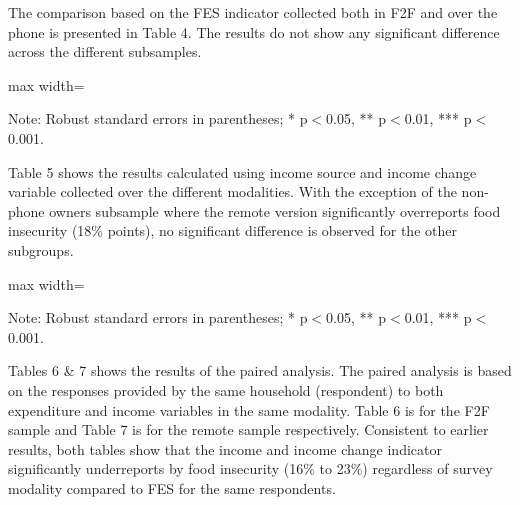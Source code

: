 \documentclass[11pt,harvard]{article}
\begin{document}
The comparison based on the FES indicator collected both in F2F and over the phone is presented in Table 4. The results do not show any significant difference across the different subsamples.

	
	\begin{table}[htbp]
		\centering
		\begin{adjustbox}{max width=\textwidth}
			\begin{threeparttable}
				\caption{Impact of Survey Modality: CARI-FES vs. rCARI-FES}
				\scriptsize
				 
				\label{tab:CARI_FES_rCARI_Modality_CAR}
				\begin{tablenotes}
					\item Note: Robust standard errors in parentheses; * p$<$0.05, ** p$<$0.01, *** p$<$0.001. 
				\end{tablenotes}
			\end{threeparttable}
		\end{adjustbox}
	\end{table}

Table 5 shows the results calculated using income source and income change variable collected over the different modalities. With the exception of the non-phone owners subsample where the remote version significantly overreports food insecurity (18\% points), no significant difference is observed for the other subgroups.

		
	\begin{table}[htbp]
		\centering
		\begin{adjustbox}{max width=\textwidth}
			\begin{threeparttable}
				\caption{Impact of Survey Modality: CARI-Inc vs. rCARI-Inc}
				\scriptsize
				 
				\label{tab:Inc_CARI_rCARI_Modality_CAR}
				\begin{tablenotes}
					\item Note: Robust standard errors in parentheses; * p$<$0.05, ** p$<$0.01, *** p$<$0.001. 
				\end{tablenotes}
			\end{threeparttable}
		\end{adjustbox}
	\end{table}


Tables 6 \& 7 shows the results of the paired analysis. The paired analysis is based on the responses provided by the same household (respondent) to both expenditure and income variables in the same modality. Table 6 is for the F2F sample and Table 7 is for the remote sample respectively. 
Consistent to earlier results, both tables show that the income and income change indicator significantly underreports by food insecurity (16\% to 23\%) regardless of survey modality compared to FES for the same respondents. 
\end{document}
